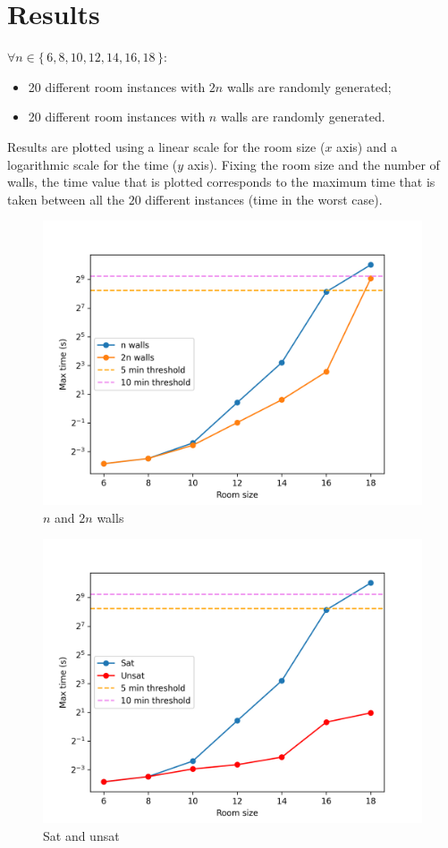 \documentclass[12pt]{article}
\newcommand*{\itc}{\mathrel{:}} %
\begin{document}
\section{Results}
$\forall n \in \{\, 6, 8, 10, 12, 14, 16, 18 \,\} \itc $
\begin{itemize}
  \item
  20 different room instances with $2n$ walls are randomly generated;
  \item
  20 different room instances with $n$ walls are randomly generated.
\end{itemize}
Results are plotted using a linear scale for the room size ($x$ axis) and
a logarithmic scale for the time ($y$ axis).
Fixing the room size and the number of walls, the time value that is plotted
corresponds to the maximum time that is taken between all the $20$ different
instances (time in the worst case).
\begin{figure}[H]
  \centering
  \includegraphics[width=.9\linewidth]{../Code/n-2n.png}
  \caption{$n$ and $2n$ walls}
  \label{n-2n}
\end{figure}
\begin{figure}[H]
  \centering
  \includegraphics[width=.9\linewidth]{../Code/sat-unsat.png}
  \caption{Sat and unsat}
  \label{sat-unsat}
\end{figure}
\end{document}
